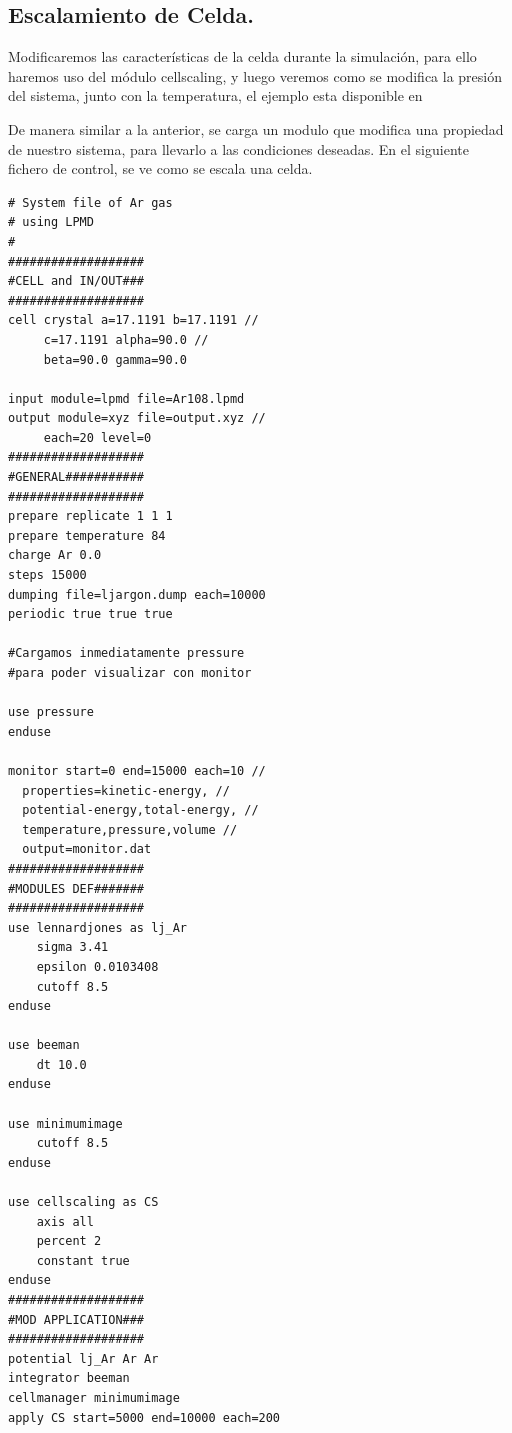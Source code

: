 \subsection{Escalamiento de Celda.}

Modificaremos las caracter\'isticas de la celda durante la simulaci\'on, para ello haremos uso del m\'odulo cellscaling, y luego veremos como se modifica la presi\'on del sistema, junto con la temperatura, el ejemplo esta disponible en


De manera similar a la anterior, se carga un modulo que modifica una propiedad de nuestro sistema, para llevarlo a las condiciones deseadas. En el siguiente fichero de control, se ve como se escala una celda.

\begin{multicols}{2}
\setlength{\columnseprule}{.5pt}
\begin{verbatim}
# System file of Ar gas 
# using LPMD
#
###################
#CELL and IN/OUT###
###################
cell crystal a=17.1191 b=17.1191 //
     c=17.1191 alpha=90.0 //
     beta=90.0 gamma=90.0

input module=lpmd file=Ar108.lpmd
output module=xyz file=output.xyz //
     each=20 level=0
###################
#GENERAL###########
###################
prepare replicate 1 1 1
prepare temperature 84
charge Ar 0.0
steps 15000
dumping file=ljargon.dump each=10000
periodic true true true

#Cargamos inmediatamente pressure
#para poder visualizar con monitor

use pressure
enduse

monitor start=0 end=15000 each=10 //
  properties=kinetic-energy, //
  potential-energy,total-energy, //
  temperature,pressure,volume //
  output=monitor.dat
###################
#MODULES DEF#######
###################
use lennardjones as lj_Ar
    sigma 3.41
    epsilon 0.0103408
    cutoff 8.5
enduse

use beeman
    dt 10.0
enduse

use minimumimage
    cutoff 8.5
enduse

use cellscaling as CS
    axis all
    percent 2
    constant true
enduse
###################
#MOD APPLICATION###
###################
potential lj_Ar Ar Ar
integrator beeman
cellmanager minimumimage
apply CS start=5000 end=10000 each=200
\end{verbatim}
\end{multicols}

